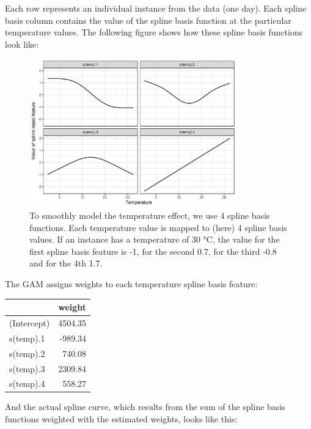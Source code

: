 \documentclass[
  10pt,
]{scrbook}
\begin{document}
Each row represents an individual instance from the data (one day).
Each spline basis column contains the value of the spline basis function at the particular temperature values.
The following figure shows how these spline basis functions look like:

\begin{figure}

{\centering \includegraphics[width=0.8\textwidth]{images/splines-1} 

}

\caption{To smoothly model the temperature effect, we use 4 spline basis functions. Each temperature value is mapped to (here) 4 spline basis values. If an instance has a temperature of 30 °C, the value for the first spline basis feature is -1, for the second 0.7, for the third -0.8 and for the 4th 1.7.}\label{fig:splines}
\end{figure}

The GAM assigns weights to each temperature spline basis feature:

\begin{table}
\centering
\begin{tabular}{lr}
\toprule
  & weight\\
\midrule
(Intercept) & 4504.35\\
s(temp).1 & -989.34\\
s(temp).2 & 740.08\\
s(temp).3 & 2309.84\\
s(temp).4 & 558.27\\
\bottomrule
\end{tabular}
\end{table}

And the actual spline curve, which results from the sum of the spline basis functions weighted with the estimated weights, looks like this:
\end{document}
